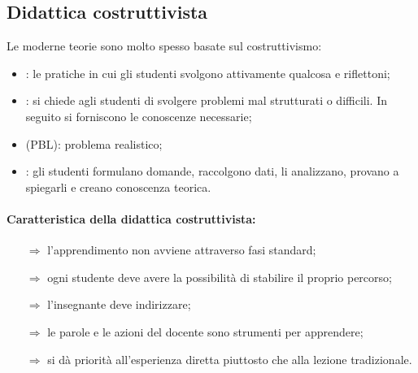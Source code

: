 

\subsection{Didattica costruttivista}

Le moderne teorie sono molto spesso basate sul costruttivismo:

\begin{itemize}
    \item {}: le pratiche in cui gli studenti svolgono attivamente qualcosa e riflettoni;
    \item {}: si chiede agli studenti di svolgere problemi mal strutturati o difficili. In seguito si forniscono le conoscenze necessarie;
    \item {} (PBL): problema realistico;
    \item {}: gli studenti formulano domande, raccolgono dati, li analizzano, provano a spiegarli e creano conoscenza teorica.
\end{itemize}


\paragraph{Caratteristica della didattica costruttivista:}

\begin{itemize}
    \item[$\Rightarrow$] l'apprendimento non avviene attraverso fasi standard;
    \item[$\Rightarrow$] ogni studente deve avere la possibilità di stabilire il proprio percorso;
    \item[$\Rightarrow$] l'insegnante deve indirizzare;
    \item[$\Rightarrow$] le parole e le azioni del docente sono strumenti per apprendere;
    \item[$\Rightarrow$] si dà priorità all'esperienza diretta piuttosto che alla lezione tradizionale.
\end{itemize}

